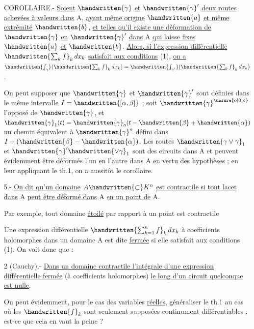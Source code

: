 
COROLLAIRE.- \uline{Soient} $\handwritten{\gamma}$ \uline{et} $\handwritten{\gamma}'$ \uline{deux routes achevées à valeurs dans} A, \uline{ayant même origine} $\handwritten{a}$ \uline{et même extrémité} $\handwritten{b}$, \uline{et telles qu'il existe une déformation de} $\handwritten{\gamma}$ \uline{en} $\handwritten{\gamma}'$ \uline{dans} A \uline{qui laisse fixes} $\handwritten{a}$ \uline{et} $\handwritten{b}$. \uline{Alors, si l'expression différentielle} $\handwritten{\sum_k f}_k\,dx_k$ \uline{satisfait aux conditions} (1), \uline{on a} $\handwritten{\int_\gamma}(\handwritten{\sum_k f}_k\,dx_k)=\handwritten{\int_{\gamma'}}(\handwritten{\sum_k f}_k\,dx_k)$.

On peut supposer que $\handwritten{\gamma}$ et $\handwritten{\gamma}'$ sont définies dans le même intervalle $I=\handwritten{[\alpha,\beta]}$ ; soit $\handwritten{\gamma}^{\unsure{o|0|\circ}}$ l'opposé de $\handwritten{\gamma}$, et $\handwritten{\gamma}_1(t)=\handwritten{\gamma}_o(t-\handwritten{\beta}+\handwritten{\alpha})$ un chemin équivalent à $\handwritten{\gamma}^o$ défini dans $I+(\handwritten{\beta}-\handwritten{\alpha})$. Les routes $\handwritten{\gamma\vee\gamma}_1$ et $\handwritten{\gamma}'\handwritten{\vee\gamma}_1$ sont des circuits dans A et peuvent évidemment être déformés l'un en l'autre dans A en vertu des hypothèses ; en leur appliquant le th.1, on a aussitôt le corollaire.

 5.- \uline{On dit qu'un domaine} $A\handwritten{\subset}K^n$ \uline{est contractile si tout lacet dans} A \uline{peut être déformé dans} A \uline{en un point de} A.

Par exemple, tout domaine \uline{étoilé} par rapport à un point est contractile

Une expression différentielle $\handwritten{\sum_{k=1}^n f}_k\,dx_k$ à coefficients holomorphes dans un domaine A est dite \uline{fermée} si elle satisfait aux conditions (1). On voit donc que :

 2 (Cauchy).- \uline{Dans un domaine contractile l'intégrale d'une expression différentielle fermée} (à coefficients holomorphes) \uline{le long d'un circuit quelconque est nulle}.

On peut évidemment, pour le cas des variables \uline{réelles}, généraliser le th.1 au cas où les $\handwritten{f}_k$ sont seulement supposées continument différentiables ; est-ce que cela en vaut la peine ?

